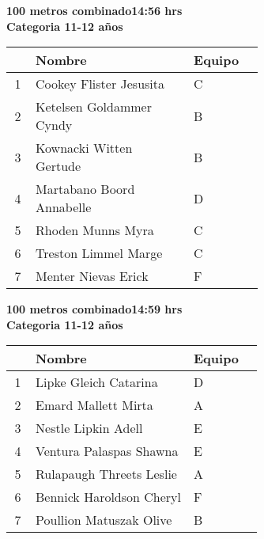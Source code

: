 \begin{minipage}{0.95\linewidth}\vspace{0.5cm} 
\begin{flushleft}
\textbf{
\hspace{-0.15cm}100 metros combinado\hspace{1.5cm}14:56 hrs \\Categoria 11-12 años}\vspace{-0.2cm} 
\end{flushleft}
\begin{tabular}{cp{0.63\linewidth}l}
\hline
& \textbf{Nombre} & \textbf{Equipo} \\ \hline
1 & Cookey Flister Jesusita & C \\ 
2 & Ketelsen Goldammer Cyndy & B \\ 
3 & Kownacki Witten Gertude & B \\ 
4 & Martabano Boord Annabelle & D \\ 
5 & Rhoden Munns Myra & C \\ 
6 & Treston Limmel Marge & C \\ 
7 & Menter Nievas Erick & F \\ 
\end{tabular}
\end{minipage}
\begin{minipage}{0.95\linewidth}\vspace{0.5cm} 
\begin{flushleft}
\textbf{
\hspace{-0.15cm}100 metros combinado\hspace{1.5cm}14:59 hrs \\Categoria 11-12 años}\vspace{-0.2cm} 
\end{flushleft}
\begin{tabular}{cp{0.63\linewidth}l}
\hline
& \textbf{Nombre} & \textbf{Equipo} \\ \hline
1 & Lipke Gleich Catarina & D \\ 
2 & Emard Mallett Mirta & A \\ 
3 & Nestle Lipkin Adell & E \\ 
4 & Ventura Palaspas Shawna & E \\ 
5 & Rulapaugh Threets Leslie & A \\ 
6 & Bennick Haroldson Cheryl & F \\ 
7 & Poullion Matuszak Olive & B \\ 
\end{tabular}
\end{minipage}
